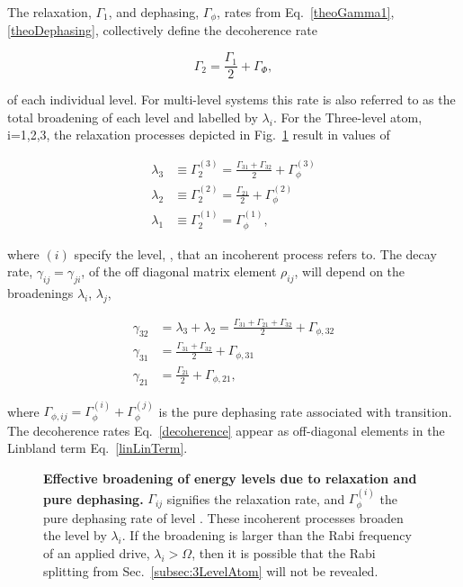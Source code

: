    The relaxation, $ \Gamma_1 $, and dephasing, $ \Gamma_{\phi} $, rates from  Eq.~\eqref{theoGamma1}, \eqref{theoDephasing}, collectively define the decoherence rate
   
   \begin{equation}
 		\Gamma_2 = \frac{\Gamma_1}{2}+\Gamma_{\Phi},
   \end{equation}
   
   \noindent of each individual level. For multi-level systems this rate is also referred to as the total broadening of each level and labelled by $ \lambda_i$. For the Three-level atom, i=1,2,3, the relaxation processes depicted in Fig.~\ref{theoBroadening} result in values of
 
   \begin{equation}
  	\begin{aligned}
  	\lambda_3&\equiv \Gamma_{2}^{(3)} = \frac{\Gamma_{31}+\Gamma_{32}}{2}+\Gamma_{\phi}^{(3)}\\
  	\lambda_2&\equiv\Gamma_{2}^{(2)} = \frac{\Gamma_{21}}{2}+\Gamma_{\phi}^{(2)}\\
  	\lambda_1&\equiv\Gamma_{2}^{(1)} = \Gamma_{\phi}^{(1)},
  	\end{aligned}
   \end{equation}
  
   \noindent where $ (i) $ specify the level, , that an incoherent process refers to. The decay rate, $ \gamma_{ij}=\gamma_{ji} $, of the off diagonal matrix element $ \rho_{ij} $, will depend on the broadenings $ \lambda_i $, $ \lambda_j $,
  
   \begin{equation}\label{decoherence}
 	 \begin{aligned}
  		\gamma_{32} & =\lambda_3+\lambda_2=\frac{\Gamma_{31}+\Gamma_{21}+\Gamma_{32}}{2}+\Gamma_{\phi,32}\\
  		\gamma_{31} & =\frac{\Gamma_{31}+\Gamma_{32}}{2}+\Gamma_{\phi,31}\\
  		\gamma_{21} & = \frac{\Gamma_{21}}{2}+\Gamma_{\phi,21},
  	\end{aligned}
   \end{equation}
   
   \noindent where $ \Gamma_{\phi,ij} = \Gamma_{\phi}^{(i)}+\Gamma_{\phi}^{(j)} $ is the pure dephasing rate associated with \lra{} transition. The decoherence rates Eq.~\eqref{decoherence} appear as off-diagonal elements in the Linbland term Eq.~\eqref{linLinTerm}. 
   
  
   \begin{figure}
   	\caption{\small \textbf{Effective broadening of energy levels due to relaxation and pure dephasing.} $ \Gamma_{ij} $ signifies the \ra{} relaxation rate, and $ \Gamma_{\phi}^{(i)} $ the pure dephasing rate of level . These incoherent processes broaden the  level by $ \lambda_i $. If the broadening is larger than the Rabi frequency of an applied drive, $ \lambda_i>\Omega$, then it is possible that the Rabi splitting from Sec.~\ref{subsec:3LevelAtom} will not be revealed.}
   	\label{theoBroadening}
   \end{figure}
   
